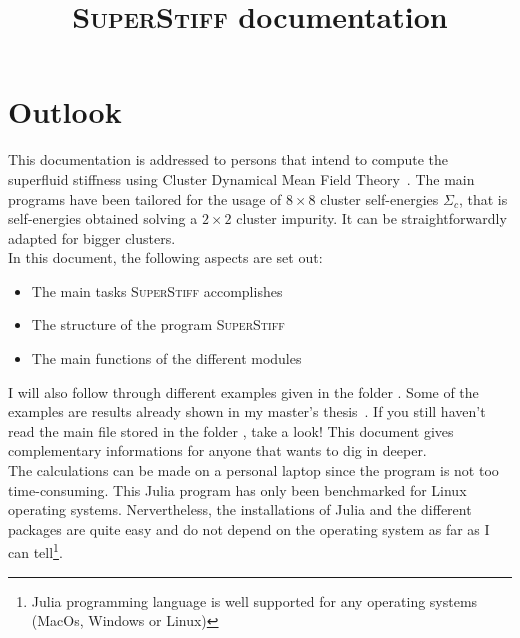 \documentclass{article}
\title{
\textmd{\textsc{SuperStiff} documentation}\\
\vspace{6in}
\vspace{1cm}
}
\begin{document}

\maketitle

\newpage
\tableofcontents
\newpage


\section{Outlook}
\label{sec:outlook}

This documentation is addressed to persons that intend to compute the superfluid stiffness using Cluster Dynamical Mean Field Theory~\cite{charlebois_these}. The main programs have been tailored for the usage of $8\times 8$ cluster self-energies $\Sigma_c$, that is self-energies obtained solving a $2\times 2$ cluster impurity. It can be straightforwardly adapted for bigger clusters.\\


In this document, the following aspects are set out:
\begin{itemize}
\item The main tasks \textsc{SuperStiff} accomplishes
\item The structure of the program \textsc{SuperStiff}
\item The main functions of the different modules
\end{itemize}

I will also follow through different examples given in the folder . Some of the examples are results already shown in my master's thesis~\cite{simard_master}. If you still haven't read the main  file stored in the folder , take a look! This document gives complementary informations for anyone that wants to dig in deeper.\\

The calculations can be made on a personal laptop since the program is not too time-consuming. This Julia program has only been benchmarked for Linux operating systems. Nervertheless, the installations of Julia and the different packages are quite easy and do not depend on the operating system as far as I can tell\footnote{Julia programming language is well supported for any operating systems (MacOs, Windows or Linux)}. 
\end{document}
